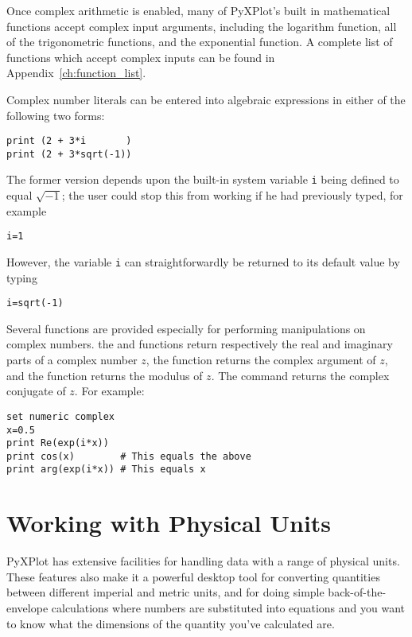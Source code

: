 Once complex arithmetic is enabled, many of PyXPlot's built in mathematical
functions accept complex input arguments, including the logarithm function, all
of the trigonometric functions, and the exponential function.  A complete list
of functions which accept complex inputs can be found in
Appendix~\ref{ch:function_list}.

Complex number literals can be entered into algebraic expressions in either of
the following two forms:

\begin{verbatim}
print (2 + 3*i       )
print (2 + 3*sqrt(-1))
\end{verbatim}

\noindent The former version depends upon the built-in system variable {\tt i}
being defined to equal $\sqrt{-1}$; the user could stop this from working if he
had previously typed, for example

\begin{verbatim}
i=1
\end{verbatim}

\noindent However, the variable {\tt i} can straightforwardly be returned to
its default value by typing

\begin{verbatim}
i=sqrt(-1)
\end{verbatim}

Several functions are provided especially for performing manipulations on
complex numbers. the  and  functions return
respectively the real and imaginary parts of a complex number $z$, the
 function returns the complex argument of $z$, and the
 function returns the modulus of $z$.  The
 command returns the complex conjugate of $z$.  For
example:

\begin{verbatim}
set numeric complex
x=0.5
print Re(exp(i*x))
print cos(x)        # This equals the above
print arg(exp(i*x)) # This equals x
\end{verbatim}

\section{Working with Physical Units}
\label{sec:units}

PyXPlot has extensive facilities for handling data with a range of physical
units.  These features also make it a powerful desktop tool for converting
quantities between different imperial and metric units, and for doing simple
back-of-the-envelope calculations where numbers are substituted into equations
and you want to know what the dimensions of the quantity you've calculated are.

